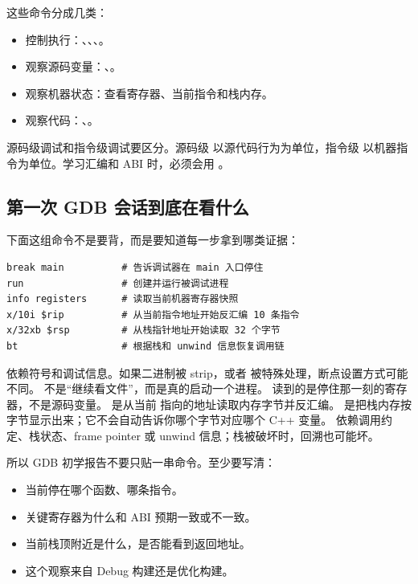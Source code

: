 这些命令分成几类：

\begin{itemize}
  \item 控制执行：、、、。
  \item 观察源码变量：、。
  \item 观察机器状态：查看寄存器、当前指令和栈内存。
  \item 观察代码：、。
\end{itemize}

源码级调试和指令级调试要区分。源码级  以源代码行为为单位，指令级  以机器指令为单位。学习汇编和 ABI 时，必须会用 。

\subsection{第一次 GDB 会话到底在看什么}

下面这组命令不是要背，而是要知道每一步拿到哪类证据：

\begin{lstlisting}[numbers=none,caption={第一次 GDB 会话的证据流}]
break main          # 告诉调试器在 main 入口停住
run                 # 创建并运行被调试进程
info registers      # 读取当前机器寄存器快照
x/10i $rip          # 从当前指令地址开始反汇编 10 条指令
x/32xb $rsp         # 从栈指针地址开始读取 32 个字节
bt                  # 根据栈和 unwind 信息恢复调用链
\end{lstlisting}

 依赖符号和调试信息。如果二进制被 strip，或者  被特殊处理，断点设置方式可能不同。 不是“继续看文件”，而是真的启动一个进程。 读到的是停住那一刻的寄存器，不是源码变量。 是从当前  指向的地址读取内存字节并反汇编。 是把栈内存按字节显示出来；它不会自动告诉你哪个字节对应哪个 C++ 变量。 依赖调用约定、栈状态、frame pointer 或 unwind 信息；栈被破坏时，回溯也可能坏。

所以 GDB 初学报告不要只贴一串命令。至少要写清：

\begin{itemize}
  \item 当前停在哪个函数、哪条指令。
  \item 关键寄存器为什么和 ABI 预期一致或不一致。
  \item 当前栈顶附近是什么，是否能看到返回地址。
  \item 这个观察来自 Debug 构建还是优化构建。
\end{itemize}

